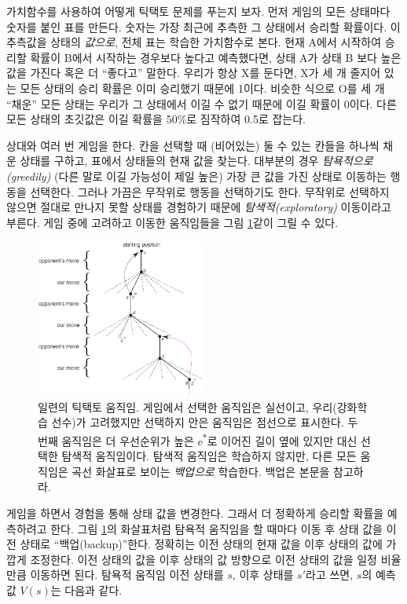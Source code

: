 
가치함수를 사용하여 어떻게 틱택토 문제를 푸는지 보자. 먼저 게임의 모든 상태마다
숫자를 붙인 표를 만든다. 숫자는 가장 최근에 추측한 그 상태에서 승리할 확률이다.
이 추측값을 상태의 \emph{값으로}, 전체 표는 학습한 가치함수로 본다. 현재 A에서
시작하여 승리할 확률이 B에서 시작하는 경우보다 높다고 예측했다면, 상태 A가 상태
B 보다 높은 값을 가진다 혹은 더 ``좋다고'' 말한다. 우리가 항상 X를 둔다면, X가
세 개 줄지어 있는 모든 상태의 승리 확률은 이미 승리했기 때문에 1이다. 비슷한
식으로 O를 세 개 ``채운'' 모든 상태는 우리가 그 상태에서 이길 수 없기 때문에
이길 확률이 0이다. 다른 모든 상태의 초깃값은 이길 확률을 50\%로 짐작하여 0.5로
잡는다.

상대와 여러 번 게임을 한다. 칸을 선택할 때 (비어있는) 둘 수 있는 칸들을 하나씩
채운 상태를 구하고, 표에서 상태들의 현재 값을 찾는다. 대부분의 경우
\emph{탐욕적으로(greedily)} (다른 말로 이길 가능성이 제일 높은) 가장 큰 값을
가진 상태로 이동하는 행동을 선택한다. 그러나 가끔은 무작위로 행동을 선택하기도
한다. 무작위로 선택하지 않으면 절대로 만나지 못할 상태를 경험하기 때문에
\emph{탐색적(exploratory)} 이동이라고 부른다. 게임 중에 고려하고 이동한
움직임들을 그림 \ref{fig:sequence-of-tic-tac-toe-moves}\과 같이 그릴 수 있다.

\begin{figure}[t]
\centering
\includegraphics[width=0.5\textwidth]{img/figure_1_sequences_of_tic_tac_toe_moves.png}
\caption{\label{fig:sequence-of-tic-tac-toe-moves}일련의 틱택토 움직임. 게임에서
선택한 움직임은 실선이고, 우리(강화학습 선수)가 고려했지만 선택하지 안은
움직임은 점선으로 표시한다. 두 번째 움직임은 더 우선순위가 높은
e\textsuperscript{$\ast$}로 이어진 길이 옆에 있지만 대신 선택한 탐색적
움직임이다. 탐색적 움직임은 학습하지 않지만, 다른 모든 움직임은 곡선 화살표로
보이는 \emph{백업으로} 학습한다. 백업은 본문을 참고하라.}
\end{figure}

게임을 하면서 경험을 통해 상태 값을 변경한다. 그래서 더 정확하게 승리할 확률을
예측하려고 한다. 그림 \ref{fig:sequence-of-tic-tac-toe-moves}의 화살표처럼
탐욕적 움직임을 할 때마다 이동 후 상태 값을 이전 상태로 ``백업(backup)''한다.
정확히는 이전 상태의 현재 값을 이후 상태의 값에 가깝게 조정한다. 이전 상태의
값을 이후 상태의 값 방향으로 이전 상태의 값을 일정 비율만큼 이동하면 된다.
탐욕적 움직임 이전 상태를 $s$, 이후 상태를 $s'$라고 쓰면, $s$의 예측값 $V(s)$는
다음과 같다.


